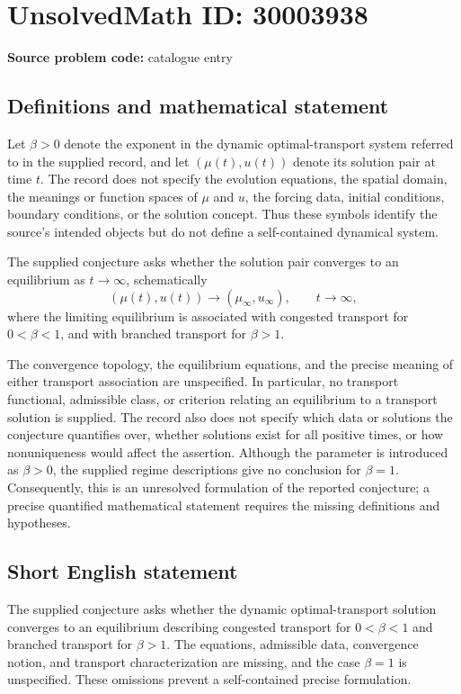 \documentclass[11pt]{article}
\begin{document}
\section*{UnsolvedMath ID: 30003938}
\textbf{Source problem code:} catalogue entry
\subsection{Definitions and mathematical statement}
Let \(\beta>0\) denote the exponent in the dynamic optimal-transport system referred to in the supplied record, and let \((\mu(t),u(t))\) denote its solution pair at time \(t\). The record does not specify the evolution equations, the spatial domain, the meanings or function spaces of \(\mu\) and \(u\), the forcing data, initial conditions, boundary conditions, or the solution concept. Thus these symbols identify the source's intended objects but do not define a self-contained dynamical system.

The supplied conjecture asks whether the solution pair converges to an equilibrium as \(t\to\infty\), schematically
\[
  (\mu(t),u(t))\longrightarrow(\mu_\infty,u_\infty),
  \qquad t\to\infty,
\]
where the limiting equilibrium is associated with congested transport for \(0<\beta<1\), and with branched transport for \(\beta>1\).

The convergence topology, the equilibrium equations, and the precise meaning of either transport association are unspecified. In particular, no transport functional, admissible class, or criterion relating an equilibrium to a transport solution is supplied. The record also does not specify which data or solutions the conjecture quantifies over, whether solutions exist for all positive times, or how nonuniqueness would affect the assertion. Although the parameter is introduced as \(\beta>0\), the supplied regime descriptions give no conclusion for \(\beta=1\). Consequently, this is an unresolved formulation of the reported conjecture; a precise quantified mathematical statement requires the missing definitions and hypotheses.
\subsection{Short English statement}
The supplied conjecture asks whether the dynamic optimal-transport solution converges to an equilibrium describing congested transport for \(0<\beta<1\) and branched transport for \(\beta>1\). The equations, admissible data, convergence notion, and transport characterization are missing, and the case \(\beta=1\) is unspecified. These omissions prevent a self-contained precise formulation.
\end{document}
